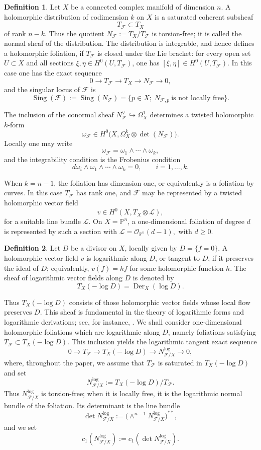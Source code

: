 \documentclass[12pt,reqno,a4paper]{amsart}
\numberwithin{equation}{section}
\theoremstyle{plain}
\theoremstyle{definition}
\newtheorem{definition}[definition]{Definition}
\DeclareMathOperator{\Sing}{Sing}
\newcommand{\cF}{\mathcal{F}}
\newcommand{\Der}{\operatorname{Der}}
\begin{document}
\begin{definition}
Let $X$ be a connected complex manifold of dimension $n$. A holomorphic
distribution of codimension $k$ on $X$ is a saturated coherent subsheaf
\[
T_{\cF}\subset T_X
\]
of rank $n-k$. Thus the quotient
$
N_{\cF}:=T_X/T_{\cF}
$
is torsion-free; it is called the normal sheaf of the distribution.
The distribution is integrable, and hence defines a holomorphic foliation, if
$T_{\cF}$ is closed under the Lie bracket: for every open set $U\subset X$ and
all sections $\xi,\eta\in H^0(U,T_{\cF})$, one has
$
[\xi,\eta]\in H^0(U,T_{\cF}).
$
In this case one has the exact sequence
\[
0\longrightarrow T_{\cF}
\longrightarrow T_X
\longrightarrow N_{\cF}
\longrightarrow 0,
\]
and the singular locus of $\cF$ is
\[
\Sing(\cF):=\Sing(N_{\cF})
=
\{p\in X;\; N_{\cF,p}\ \text{is not locally free}\}.
\]
\end{definition}

The inclusion of the conormal sheaf $
N_{\cF}^{\vee}\hookrightarrow \Omega_X^1
$
determines a twisted holomorphic $k$-form
$$
\omega_{\cF}\in H^0\bigl(X,\Omega_X^k\otimes \det(N_{\cF})\bigr).
$$
Locally one may write
\[
\omega_{\cF}=\omega_1\wedge\cdots\wedge\omega_k,
\]
and the integrability condition is the Frobenius condition
\[
d\omega_i\wedge \omega_1\wedge\cdots\wedge\omega_k=0,
\qquad i=1,\ldots,k.
\]

When $k=n-1$, the foliation has dimension one, or equivalently is a foliation
by curves. In this case $T_{\cF}$ has rank one, and $\cF$ may be represented by
a twisted holomorphic vector field
\[
v\in H^0(X,T_X\otimes \mathcal L),
\]
for a suitable line bundle $\mathcal L$. On $X=\mathbb P^n$, a
one-dimensional foliation of degree $d$ is represented by such a section with
$
\mathcal L=\mathcal O_{\mathbb P^n}(d-1),
$
with $d\geq 0$. 
\begin{definition}
Let $D$ be a divisor on $X$, locally given by $D=\{f=0\}$. A holomorphic vector
field $v$ is logarithmic along $D$, or tangent to $D$, if it preserves the ideal
of $D$; equivalently,
$
v(f)=hf
$
for some holomorphic function $h$. The sheaf of logarithmic vector fields along
$D$ is denoted by
\[
T_X(-\log D)=\Der_X(\log D).
\]
\end{definition}
Thus $T_X(-\log D)$ consists   of those holomorphic vector fields whose
local flow preserves $D$. This sheaf is fundamental in the theory of
logarithmic forms and logarithmic derivations; see, for instance,
\cite{Saito,Ale_s,Alex1,Alu11}.
We shall consider one-dimensional holomorphic foliations which are logarithmic
along $D$, namely foliations satisfying
$
T_{\cF}\subset T_X(-\log D).
$
This inclusion yields the logarithmic tangent exact sequence
\[
0\longrightarrow T_{\cF}
\longrightarrow T_X(-\log D)
\longrightarrow N_{\cF/X}^{\log}
\longrightarrow 0,
\]
where, throughout the paper, we assume that \(T_{\cF}\) is saturated in
\(T_X(-\log D)\) and set
\[
N_{\cF/X}^{\log}:=T_X(-\log D)/T_{\cF}.
\]
Thus \(N_{\cF/X}^{\log}\) is torsion-free; when it is locally free, it is the
logarithmic normal bundle of the foliation. Its determinant is the line bundle
\[
\det N_{\cF/X}^{\log}:=
\bigl(\wedge^{n-1}N_{\cF/X}^{\log}\bigr)^{\ast\ast},
\]
and we set
\[
c_1(N_{\cF/X}^{\log}):=c_1(\det N_{\cF/X}^{\log}).
\]
\end{document}
